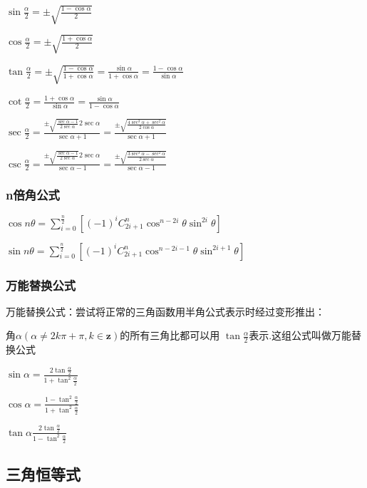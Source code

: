 \documentclass[UTF8]{ctexbook}
\newcommand{\mathCombination}[2]{C_{#1}^{#2}}
\newcommand{\upDownSum}[2]{\sum\limits_{#2}^{#1}}
\begin{document}
{{{{    $\sin\frac{\alpha}{2} = \pm\sqrt{\frac{1 - \cos\alpha}{2}}$

    $\cos\frac{\alpha}{2} = \pm\sqrt{\frac{1 + \cos\alpha}{2}}$

    $\tan\frac{\alpha}{2} = \pm\sqrt{\frac{1-\cos\alpha}{1+\cos\alpha}} = \frac{\sin\alpha}{1+\cos\alpha} = \frac{1-\cos\alpha}{\sin\alpha}$

    $\cot\frac{\alpha}{2} = \frac{1+\cos\alpha}{\sin\alpha} = \frac{\sin\alpha}{1-\cos\alpha}$

    $\sec\frac{\alpha}{2} = \frac{\pm\sqrt{\frac{\sec\alpha - 1}{2\sec\alpha}}2\sec\alpha}{\sec\alpha + 1} = \frac{\pm\sqrt{\frac{4\sec^3\alpha + \sec^2\alpha}{2\cos\alpha}}}{\sec\alpha + 1}$

    $\csc\frac{\alpha}{2} = \frac{\pm\sqrt{\frac{\sec\alpha - 1}{2\sec\alpha}}2\sec\alpha}{\sec\alpha - 1} = \frac{\pm\sqrt{\frac{3\sec^3\alpha - \sec^2\alpha}{2\sec\alpha}}}{\sec\alpha - 1}$
  }%

  \subsubsection{n倍角公式}{
    $\cos{n\theta} = \upDownSum{\frac{n}{2}}{i = 0}[(-1)^i\mathCombination{2i + 1}{n}\cos^{n - 2i}\theta\sin^{2i}\theta]$

    $\sin{n\theta} = \upDownSum{\frac{n}{2}}{i = 0}[(-1)^i\mathCombination{2i + 1}{n}\cos^{n - 2i - 1}\theta\sin^{2i+1}\theta]$
  }%

  \subsubsection{万能替换公式}{
    万能替换公式：尝试将正常的三角函数用半角公式表示时经过变形推出：

    角$\alpha(\alpha \neq 2k\pi + \pi ,k \in \mathbf{z})$的所有三角比都可以用 $\tan\frac{\alpha}{2}$表示.这组公式叫做万能替换公式

    $\sin\alpha = \frac{2\tan\frac{\alpha}{2}}{1+\tan^2\frac{\alpha}{2}}$

    $\cos\alpha = \frac{1 - \tan^2\frac{\alpha}{2}}{1 + \tan^2\frac{\alpha}{2}}$

    $\tan\alpha \frac{2\tan\frac{\alpha}{2}}{1 - \tan^2\frac{\alpha}{2}}$
  }%

}%

\subsection{三角恒等式}{

}}}
\end{document}
